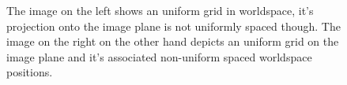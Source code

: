 \begin{figure}
\centering
{}
\caption[The Projected Grid Concept]{The image on the left
 shows an uniform grid in worldspace, it's
projection onto the image plane is not uniformly spaced though. The image on the
right  on the other hand depicts an uniform grid on
the image plane and it's associated non-uniform spaced worldspace positions.}
\label{fig:projectedgrid}
\end{figure}


